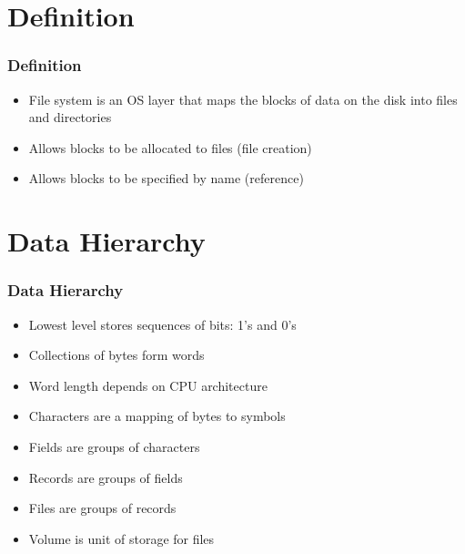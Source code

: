 \documentclass{beamer}
\begin{document}
\section{Definition}
\begin{frame}
\frametitle{Definition}
\begin{itemize}
\item File system is an OS layer that maps the blocks of data on the disk into files and directories
\item Allows blocks to be allocated to files (file creation)
\item Allows blocks to be specified by name (reference)
\end{itemize}
\end{frame}
\section{Data Hierarchy}
\begin{frame}
\frametitle{Data Hierarchy}
\begin{itemize}
\item Lowest level stores sequences of bits: 1's and 0's
\item Collections of bytes form words
\item Word length depends on CPU architecture
\item Characters are a mapping of bytes to symbols
\item Fields are groups of characters
\item Records are groups of fields
\item Files are groups of records
\item Volume is unit of storage for files
\end{itemize}
\end{frame}
\end{document}

